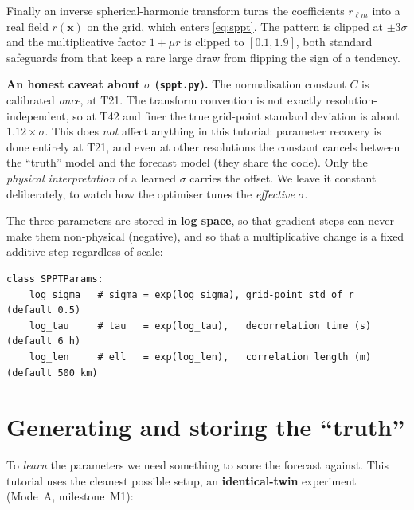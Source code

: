 \documentclass[11pt]{article}
\newcommand{\rlm}{r_{\ell m}}
\newcommand{\code}[1]{\texttt{#1}}
\begin{document}
Finally an inverse spherical-harmonic transform turns the coefficients $\rlm$
into a real field $r(\mathbf x)$ on the grid, which enters \eqref{eq:sppt}. The
pattern is clipped at $\pm 3\sigma$ and the multiplicative factor
$1+\mu r$ is clipped to $[0.1,1.9]$, both standard safeguards from
\citet{palmer2009} that keep a rare large draw from flipping the sign of a
tendency.

\begin{keybox}
\textbf{An honest caveat about $\sigma$ (\code{sppt.py}).} The normalisation
constant $C$ is calibrated \emph{once}, at T21. The transform convention is not
exactly resolution-independent, so at T42 and finer the true grid-point standard
deviation is about $1.12\times\sigma$. This does \emph{not} affect anything in
this tutorial: parameter recovery is done entirely at T21, and even at other
resolutions the constant cancels between the ``truth'' model and the forecast
model (they share the code). Only the \emph{physical interpretation} of a learned
$\sigma$ carries the offset. We leave it constant deliberately, to watch how the
optimiser tunes the \emph{effective} $\sigma$.
\end{keybox}

The three parameters are stored in \textbf{log space}, so that gradient steps can
never make them non-physical (negative), and so that a multiplicative change is a
fixed additive step regardless of scale:
\begin{lstlisting}
class SPPTParams:
    log_sigma   # sigma = exp(log_sigma), grid-point std of r     (default 0.5)
    log_tau     # tau   = exp(log_tau),   decorrelation time (s)  (default 6 h)
    log_len     # ell   = exp(log_len),   correlation length (m)  (default 500 km)
\end{lstlisting}

\section{Generating and storing the ``truth''}\label{sec:data}

To \emph{learn} the parameters we need something to score the forecast against.
This tutorial uses the cleanest possible setup, an \textbf{identical-twin}
experiment (Mode~A, milestone~M1):
\end{document}
